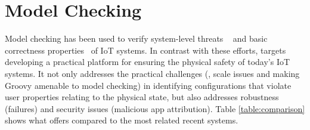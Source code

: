 \section{Model Checking}
{\color{black}Model checking has
been used to verify system-level threats ~\cite{Mohsin2017:IoTChecker,Mohsin2017:IoTRiskAnalyzer,Mohsin2016:IoTSAT} and {\color{black}basic correctness properties~\cite{Liang:2015:SBI:2737095.2737115,190480,215955,Newcomb:2017:ICI:3133850.3133860}} of IoT systems.}
In contrast with these efforts, \sys targets developing a practical platform for ensuring
the physical safety of today's IoT systems. It not only addresses
the practical challenges (\eg, scale issues and making Groovy amenable to model checking) 
in identifying configurations that violate user properties relating to
the physical state, but also addresses robustness (failures) and security issues (malicious app attribution). {\color{black}Table \ref{table:comparison} shows what \sys offers compared to the most related recent systems.}
